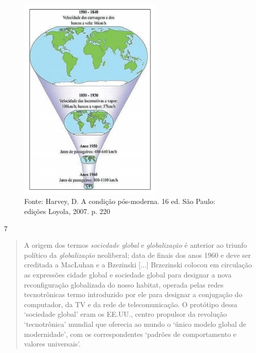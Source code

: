 \begin{figure}[htpb!]
\includegraphics[width=2.70776in,height=3.93646in]{./imgs/img2.jpg}
\caption{Fonte: Harvey, D. A condição pós-moderna. 16 ed. São Paulo: edições Loyola, 2007. p. 220}
\end{figure}


\num{7}

\begin{quote}
A origem dos termos \emph{sociedade global}
e \emph{globalização} é anterior ao triunfo político
da \emph{globalização} neoliberal; data
de finais dos anos 1960 e deve ser creditada a MacLuhan e a Bzezinski
{[}...{]} Brzezinski colocou em circulação as expressões cidade global e
sociedade global para designar a nova reconfiguração globalizada do
nosso habitat, operada pelas redes tecnotrônicas termo introduzido por
ele para designar a conjugação do computador, da TV e da rede de
telecomunicação. O protótipo dessa `sociedade global' eram os EE.UU.,
centro propulsor da revolução `tecnotrônica' mundial que oferecia ao
mundo o `único modelo global de modernidade', com os correspondentes
`padrões de comportamento e valores universais'.

\end{quote}

